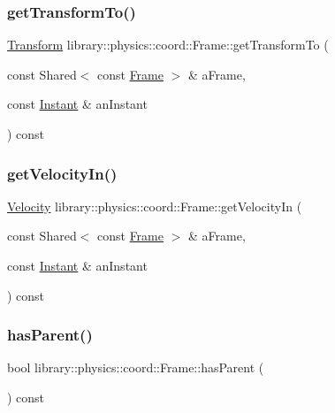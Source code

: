 \subsubsection{\texorpdfstring{get\+Transform\+To()}{getTransformTo()}}
{\footnotesize\ttfamily \hyperlink{classlibrary_1_1physics_1_1coord_1_1_transform}{Transform} library\+::physics\+::coord\+::\+Frame\+::get\+Transform\+To (\begin{DoxyParamCaption}\item[{const Shared$<$ const \hyperlink{classlibrary_1_1physics_1_1coord_1_1_frame}{Frame} $>$ \&}]{a\+Frame,  }\item[{const \hyperlink{classlibrary_1_1physics_1_1time_1_1_instant}{Instant} \&}]{an\+Instant }\end{DoxyParamCaption}) const}

\mbox{\label{classlibrary_1_1physics_1_1coord_1_1_frame_ae7974e759c97f32ccc966cbcc3baf77c}} 
\subsubsection{\texorpdfstring{get\+Velocity\+In()}{getVelocityIn()}}
{\footnotesize\ttfamily \hyperlink{classlibrary_1_1physics_1_1coord_1_1_velocity}{Velocity} library\+::physics\+::coord\+::\+Frame\+::get\+Velocity\+In (\begin{DoxyParamCaption}\item[{const Shared$<$ const \hyperlink{classlibrary_1_1physics_1_1coord_1_1_frame}{Frame} $>$ \&}]{a\+Frame,  }\item[{const \hyperlink{classlibrary_1_1physics_1_1time_1_1_instant}{Instant} \&}]{an\+Instant }\end{DoxyParamCaption}) const}

\mbox{\label{classlibrary_1_1physics_1_1coord_1_1_frame_afd83dec4bf4e2aabc2b31019b282965e}} 
\subsubsection{\texorpdfstring{has\+Parent()}{hasParent()}}
{\footnotesize\ttfamily bool library\+::physics\+::coord\+::\+Frame\+::has\+Parent (\begin{DoxyParamCaption}{ }\end{DoxyParamCaption}) const}

